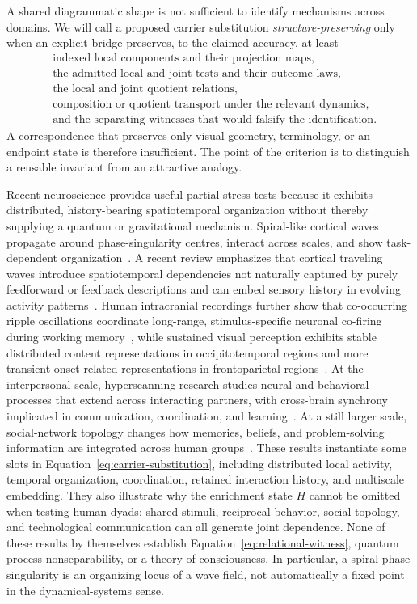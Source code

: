 \documentclass[11pt]{article}
\begin{document}
A shared diagrammatic shape is not sufficient to identify mechanisms across domains. We will call a proposed carrier substitution \emph{structure-preserving} only when an explicit bridge preserves, to the claimed accuracy, at least
\begin{equation}
\begin{aligned}
&\text{indexed local components and their projection maps},\\
&\text{the admitted local and joint tests and their outcome laws},\\
&\text{the local and joint quotient relations},\\
&\text{composition or quotient transport under the relevant dynamics},\\
&\text{and the separating witnesses that would falsify the identification}.
\end{aligned}
\label{eq:carrier-substitution}
\end{equation}
A correspondence that preserves only visual geometry, terminology, or an endpoint state is therefore insufficient. The point of the criterion is to distinguish a reusable invariant from an attractive analogy.

Recent neuroscience provides useful partial stress tests because it exhibits distributed, history-bearing spatiotemporal organization without thereby supplying a quantum or gravitational mechanism. Spiral-like cortical waves propagate around phase-singularity centres, interact across scales, and show task-dependent organization~\cite{xu2023}. A recent review emphasizes that cortical traveling waves introduce spatiotemporal dependencies not naturally captured by purely feedforward or feedback descriptions and can embed sensory history in evolving activity patterns~\cite{muller2026}. Human intracranial recordings further show that co-occurring ripple oscillations coordinate long-range, stimulus-specific neuronal co-firing during working memory~\cite{verzhbinsky2026}, while sustained visual perception exhibits stable distributed content representations in occipitotemporal regions and more transient onset-related representations in frontoparietal regions~\cite{vishne2023}. At the interpersonal scale, hyperscanning research studies neural and behavioral processes that extend across interacting partners, with cross-brain synchrony implicated in communication, coordination, and learning~\cite{schilbach2025}. At a still larger scale, social-network topology changes how memories, beliefs, and problem-solving information are integrated across human groups~\cite{momennejad2022}. These results instantiate some slots in Equation~\eqref{eq:carrier-substitution}, including distributed local activity, temporal organization, coordination, retained interaction history, and multiscale embedding. They also illustrate why the enrichment state $H$ cannot be omitted when testing human dyads: shared stimuli, reciprocal behavior, social topology, and technological communication can all generate joint dependence. None of these results by themselves establish Equation~\eqref{eq:relational-witness}, quantum process nonseparability, or a theory of consciousness. In particular, a spiral phase singularity is an organizing locus of a wave field, not automatically a fixed point in the dynamical-systems sense.
\end{document}
